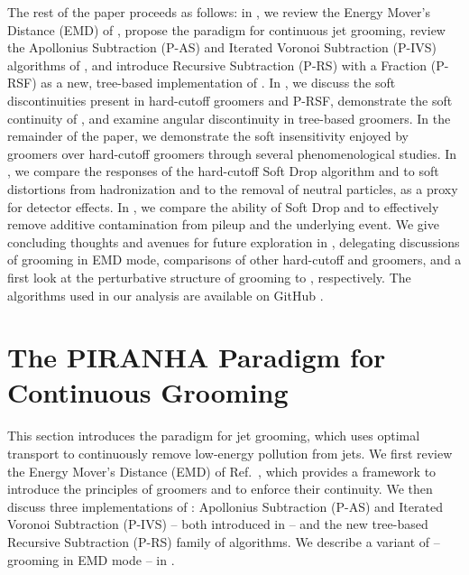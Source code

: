 The rest of the paper proceeds as follows:
%
in , we review the Energy Mover's Distance (EMD) of , propose the \PIRANHA{} paradigm for continuous jet grooming, review the Apollonius Subtraction (P-AS) and Iterated Voronoi Subtraction (P-IVS) algorithms of , and introduce Recursive Subtraction (P-RS) with a Fraction (P-RSF) as a new, tree-based implementation of \PIRANHA{}.
%
In , we discuss the soft discontinuities present in hard-cutoff groomers and P-RSF, demonstrate the soft continuity of , and examine angular discontinuity in tree-based groomers.
%
In the remainder of the paper, we demonstrate the soft insensitivity enjoyed by \PIRANHA{} groomers over hard-cutoff groomers through several phenomenological studies.
%
In , we compare the responses of the hard-cutoff Soft Drop algorithm and  to soft distortions from hadronization and to the removal of neutral particles, as a proxy for detector effects.
%
In , we compare the ability of Soft Drop and  to effectively remove additive contamination from pileup and the underlying event.
%
We give concluding thoughts and avenues for future exploration in , delegating discussions of \PIRANHA{} grooming in EMD mode, comparisons of other hard-cutoff and \PIRANHA{} groomers, and a first look at the perturbative structure of \PIRANHA{} grooming to , respectively.
%
The \PIRANHA{} algorithms used in our analysis are available on GitHub \cite{piranhagithub}.


\section{The PIRANHA{} Paradigm for Continuous Grooming}
\label{sec:PIRANHA}

This section introduces the \PIRANHA{} paradigm for jet grooming, which uses optimal transport to continuously remove low-energy pollution from jets.
%
We first review the Energy Mover's Distance (EMD) of Ref.~\cite{Komiske:2019fks}, which provides a framework to introduce the principles of \PIRANHA{} groomers and to enforce their continuity.
%
We then discuss three implementations of \PIRANHA{}:
%
Apollonius Subtraction (P-AS) and Iterated Voronoi Subtraction (P-IVS) -- both introduced in  -- and the new tree-based Recursive Subtraction (P-RS) family of \PIRANHA{} algorithms.
%
We describe a variant of \PIRANHA{} -- grooming in EMD mode -- in .

